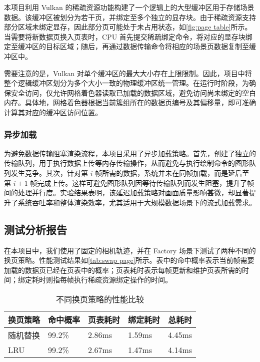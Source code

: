 本项目利用 Vulkan 的稀疏资源功能构建了一个逻辑上的大型缓冲区用于存储场景数据。该缓冲区被划分为若干页，并绑定至多个独立的显存块。由于稀疏资源支持部分区域未绑定显存，因此部分页可能处于未占用状态，如\autoref{fig:page table}所示。当需要将新数据页换入页表时，CPU 首先提交稀疏绑定命令，将对应的显存块绑定至缓冲区的目标区域；随后，再通过数据传输命令将相应的场景页数据复制至缓冲区中。

需要注意的是，Vulkan 对单个缓冲区的最大大小存在上限限制。因此，项目中将整个逻辑缓冲区划分为多个大小一致的物理缓冲区统一管理。在运行时阶段，为确保安全访问，仅允许网格着色器读取已加载的数据区域，避免访问尚未绑定的空白内存。具体地，网格着色器根据当前簇组所在的数据页编号及其偏移量，即可准确计算其对应的缓冲区访问位置。

\subsubsection{异步加载}

为避免数据传输阻塞渲染流程，本项目采用了异步加载策略\cite{UnityStreaming}。首先，创建了独立的传输队列，用于执行数据上传等内存传输操作，从而避免与执行绘制命令的图形队列发生竞争。其次，针对第 $i$ 帧所需的数据，系统并未在同帧加载，而是延后至第 $i{+}1$ 帧完成上传。这样可避免图形队列因等待传输队列而发生阻塞，提升了帧间的处理并行度。实验结果表明，该延迟加载策略对画面质量影响甚微，却显著提升了系统吞吐率和整体渲染效率，尤其适用于大规模数据场景下的流式加载需求。

\subsection{测试分析报告} \label{subsec:streaming test}

在本项目中，我们使用了固定的相机轨迹，并在 Factory 场景下测试了两种不同的换页策略。性能测试结果如\autoref{tab:swap page}所示。表中的命中概率表示当前帧需要加载的数据页已经在页表中的概率；页表耗时表示每帧更新和维护页表所需的时间；绑定耗时则指每帧执行稀疏资源绑定操作的时间。

\begin{table}[H]
    \caption{\label{tab:swap page}不同换页策略的性能比较}
    \begin{tabularx}{\linewidth}{|X<{\centering}|X<{\centering}|X<{\centering}|X<{\centering}|X<{\centering}|}
        \hline
        换页策略 & 命中概率 & 页表耗时 & 绑定耗时 & 总耗时 \\ \hline
        随机替换 & 99.2\% & 2.86ms & 1.59ms & 4.45ms \\ \hline
        LRU & 99.2\% & 2.67ms & 1.47ms & 4.14ms \\ \hline
    \end{tabularx}
\end{table}

